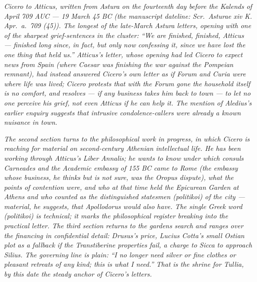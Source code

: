 
\textit{Cicero to Atticus, written from Astura on the
fourteenth day before the Kalends of April 709 AUC ---
19 March 45 BC (the manuscript dateline: \textit{Scr.\
Asturae xiv K. Apr.\ a.\ 709 (45)}). The longest of
the late-March Astura letters, opening with one of the
sharpest grief-sentences in the cluster: ``We are
finished, finished, Atticus --- finished long since,
in fact, but only now confessing it, since we have
lost the one thing that held us.'' Atticus's letter,
whose opening had led Cicero to expect news from
Spain (where Caesar was finishing the war against the
Pompeian remnant), had instead answered Cicero's own
letter as if Forum and Curia were where life was
lived; Cicero protests that with the Forum gone the
household itself is no comfort, and resolves --- if
any business takes him back to town --- to let no one
perceive his grief, not even Atticus if he can help
it. The mention of Aledius's earlier enquiry suggests
that intrusive condolence-callers were already a
known nuisance in town.}

\textit{The second section turns to the philosophical
work in progress, in which Cicero is reaching for
material on second-century Athenian intellectual
life. He has been working through Atticus's
\textit{Liber Annalis}; he wants to know under which
consuls Carneades and the Academic embassy of 155 BC
came to Rome (the embassy whose business, he thinks
but is not sure, was the Oropus dispute), what the
points of contention were, and who at that time held
the Epicurean Garden at Athens and who counted as the
distinguished \textit{statesmen} (\textit{politikoi})
of the city --- material, he suggests, that
Apollodorus would also have. The single Greek word
(\textit{politikoi}) is technical; it marks the
philosophical register breaking into the practical
letter. The third section returns to the gardens
search and ranges over the financing in confidential
detail: Drusus's price, Lucius Cotta's small Ostian
plot as a fallback if the Transtiberine properties
fail, a charge to Sicca to approach Silius. The
governing line is plain: ``I no longer need silver or
fine clothes or pleasant retreats of any kind; this
is what I need.'' That is the shrine for Tullia, by
this date the steady anchor of Cicero's letters.}
